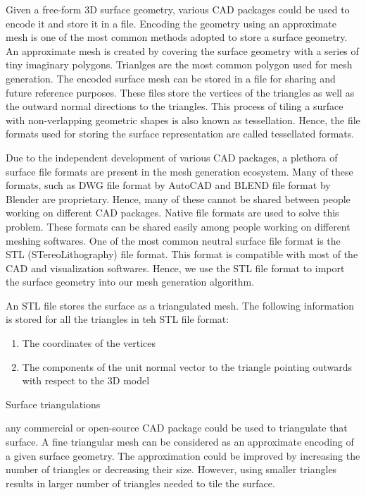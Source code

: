 Given a free-form 3D surface geometry, various CAD packages could be used to encode it and store it in a file. Encoding the geometry using an approximate mesh is one of the most common methods adopted to store a surface geometry. An approximate mesh is created by covering the surface geometry with a series of tiny imaginary polygons. Trianlges are the most common polygon used for mesh generation. The encoded surface mesh can be stored in a file for sharing and future reference purposes. These files store the vertices of the triangles as well as the outward normal directions to the triangles. This process of tiling a surface with non-verlapping geometric shapes is also known as tessellation. Hence, the file formats used for storing the surface representation are called tessellated formats.

Due to the independent development of various CAD packages, a plethora of surface file formats are present in the mesh generation ecosystem. Many of these formats, such as DWG file format by AutoCAD and BLEND file format by Blender are proprietary. Hence, many of these cannot be shared between people working on different CAD packages. Native file formats are used to solve this problem. These formats can be shared easily among people working on different meshing softwares. One of the most common neutral surface file format is the STL (STereoLithography) file format. This format is compatible with most of the CAD and visualization softwares. Hence, we use the STL file format to import the surface geometry into our mesh generation algorithm.

An STL file stores the surface as a triangulated mesh. The following information is stored for all the triangles in teh STL file format:

\begin{enumerate}
  \item The coordinates of the vertices
  \item The components of the unit normal vector to the triangle pointing outwards with respect to the 3D model
\end{enumerate}

Surface triangulations

any commercial or open-source CAD package could be used to triangulate that surface. A fine triangular mesh can be considered as an approximate encoding of a given surface geometry. The approximation could be improved by increasing the number of triangles or decreasing their size. However, using smaller triangles results in larger number of triangles needed to tile the surface.


